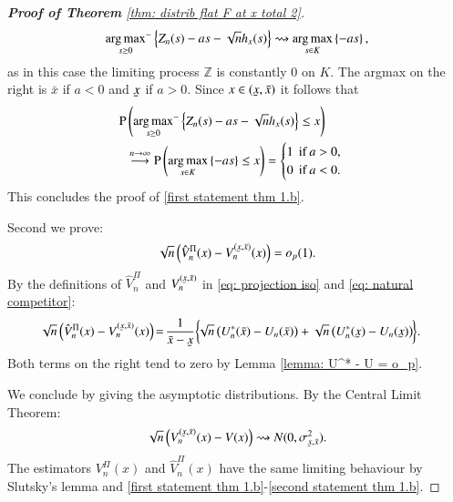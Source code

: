 \begin{proof}[\hypertarget{proof of thm 1 b}{\textbf{Proof of Theorem}} \ref{thm: distrib flat F at x total 2}]
\begin{align*}
    {\operatorname*{arg\,max}_{s \geq 0}}^{-} \left\{ Z_n(s) - a s - \sqrt{n} h_x(s) \right\} \rightsquigarrow \operatorname*{arg\,max}_{s \in K} \left\{ -as \right\},
\end{align*}
as in this case the limiting process $\mathbb{Z}$ is constantly $0$ on $K$. The argmax on the right is $\bar{x}$ if $a<0$ and $\ubar{x}$ if $a>0$. Since $x \in (\ubar{x},\bar{x})$ it follows that
\begin{align*}
    \mathrm{P}& \left(  {\operatorname*{arg\,max}_{s \geq 0}}^{-} \left\{ Z_n(s) - a s - \sqrt{n} h_x(s) \right\} \leq x \right) \\
    &\stackrel{n \rightarrow \infty}{\longrightarrow}  \mathrm{P} \left(  \operatorname*{arg\,max}_{s \in K} \left\{ -as \right\} \leq x \right) = \begin{cases}
        1 \: \: \text{if} \: a>0, \\
        0 \: \: \text{if} \: a < 0.
    \end{cases}
\end{align*}
This concludes the proof of \eqref{first statement thm 1.b}. 

Second we prove:
\begin{align}\label{second statement thm 1.b}
        \sqrt{n} \left( \hat{V}^{\Pi}_n(x) -V^{(\ubar{x},\bar{x})}_n (x) \right) = o_p(1).
\end{align}
By the definitions of $\hat{V}^{\Pi}_n$ and $V^{(\ubar{x},\bar{x})}_n$ in \eqref{eq: projection iso} and \eqref{eq: natural competitor}:
    \begin{align*}
        \sqrt{n} &\left( \hat{V}^{\Pi}_n(x)-V^{(\ubar{x},\bar{x})}_n (x) \right) \hspace{-0.05cm} = \hspace{-0.05cm}\frac{1}{\bar{x}-\ubar{x}} \bigg\{ \hspace{-0.1cm} \sqrt{n} \left(  U^*_n(\bar{x}) - U_n(\bar{x}) \right) + \sqrt{n} \left(  U^*_n(\ubar{x}) - U_n(\ubar{x})  \right) \hspace{-0.1cm} \bigg\}.
    \end{align*}
Both terms on the right tend to zero by Lemma \ref{lemma: U^* - U = o_p}.

We conclude by giving the asymptotic distributions. By the Central Limit Theorem:
\begin{align}\label{eq: asymptotic distribution empirical slope}
       \sqrt{n} \left(V^{(\ubar{x},\bar{x})}_n (x)-V(x) \right) \rightsquigarrow N(0,\sigma^2_{\ubar{x},\bar{x}}).
\end{align}
The estimators $V^{\Pi}_n(x)$ and $\hat{V}^{\Pi}_n(x)$ have the same limiting behaviour by Slutsky's lemma and \eqref{first statement thm 1.b}-\eqref{second statement thm 1.b}.
\end{proof}

